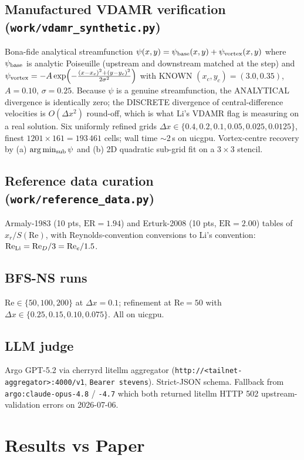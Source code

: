 \documentclass[11pt,letterpaper]{article}
\begin{document}
\subsection{Manufactured VDAMR verification (\texttt{work/vdamr\_synthetic.py})}
Bona-fide analytical streamfunction $\psi(x,y) = \psi_{\rm base}(x,y) + \psi_{\rm vortex}(x,y)$ where
$\psi_{\rm base}$ is analytic Poiseuille (upstream and downstream matched at the step) and
$\psi_{\rm vortex} = -A\exp\!\left(-\frac{(x-x_c)^2 + (y-y_c)^2}{2\sigma^2}\right)$ with
KNOWN $(x_c, y_c) = (3.0, 0.35)$, $A=0.10$, $\sigma=0.25$. Because $\psi$ is a genuine
streamfunction, the ANALYTICAL divergence is identically zero; the DISCRETE divergence of
central-difference velocities is $O(\Delta x^2)$ round-off, which is what Li's VDAMR flag
is measuring on a real solution. Six uniformly refined grids
$\Delta x \in \{0.4, 0.2, 0.1, 0.05, 0.025, 0.0125\}$, finest $1201\times 161 = 193\,461$
cells; wall time $\sim$2\,s on uicgpu. Vortex-centre recovery by (a) $\arg\min_{\rm sub}\psi$
and (b) 2D quadratic sub-grid fit on a $3\times3$ stencil.

\subsection{Reference data curation (\texttt{work/reference\_data.py})}
Armaly-1983 (10 pts, $\mathrm{ER}=1.94$) and Erturk-2008 (10 pts, $\mathrm{ER}=2.00$)
tables of $x_r/S(\mathrm{Re})$, with Reynolds-convention conversions to Li's convention:
$\mathrm{Re}_{\rm Li} = \mathrm{Re}_D / 3 = \mathrm{Re}_e / 1.5$.

\subsection{BFS-NS runs}
$\mathrm{Re}\in\{50, 100, 200\}$ at $\Delta x = 0.1$; refinement at $\mathrm{Re}=50$ with
$\Delta x \in \{0.25, 0.15, 0.10, 0.075\}$. All on uicgpu.

\subsection{LLM judge}
Argo GPT-5.2 via cherryrd litellm aggregator (\texttt{http://<tailnet-aggregator>:4000/v1},
\texttt{Bearer stevens}). Strict-JSON schema. Fallback from
\texttt{argo:claude-opus-4.8} / \texttt{-4.7} which both returned litellm HTTP 502
upstream-validation errors on 2026-07-06.

\section{Results vs Paper}
\end{document}
